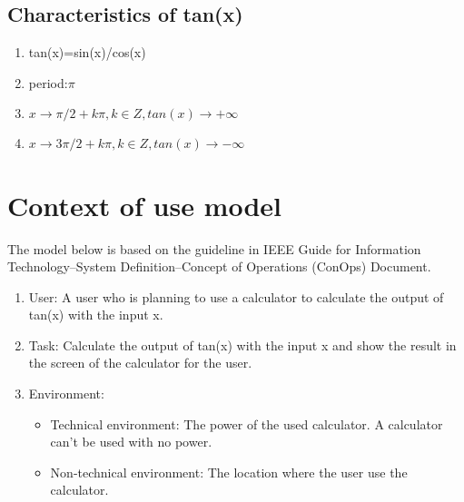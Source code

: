 \documentclass[10pt,a4paper,twoside]{article}
\begin{document}




\subsection{Characteristics of tan(x)}
\begin{enumerate}
\item tan(x)=sin(x)/cos(x)
\item period:$\pi$
\item $x\rightarrow \pi /2+k\pi, k\in Z,tan(x)\rightarrow+\infty$
\item $x\rightarrow3\pi/2+k\pi, k\in Z,tan(x)\rightarrow-\infty$
\end{enumerate}


\section{Context of use model}
The model below is based on the guideline in IEEE Guide for Information Technology--System Definition--Concept of Operations (ConOps) Document.
\cite{1998702}
\begin{enumerate}
\item 
User: A user who is planning to use a calculator to calculate the output of tan(x) with the input x.
\item
Task: Calculate the output of tan(x) with the input x and show the result in the screen of the calculator for the user.
\item
Environment:
\begin{itemize}
\item Technical environment:
The power of the used calculator. A calculator can't be used with no power.
\item Non-technical environment:
The location where the user use the calculator.
\end{itemize}
\end{enumerate}


\printbibliography
\end{document}
